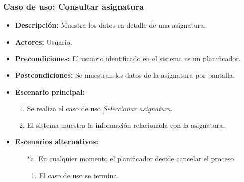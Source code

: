 \subsubsection*{Caso de uso: Consultar asignatura}
\begin{itemize}
\item{\bf Descripción:} Muestra los datos en detalle de una asignatura.
\item{\bf Actores:} Usuario.
\item{\bf Precondiciones:} El usuario identificado en el sistema es un planificador.
\item{\bf Postcondiciones:} Se muestran los datos de la asignatura por pantalla.
\item{\bf Escenario principal:} 
	\begin{enumerate}
	\item Se realiza el caso de uso {\em \hyperref[select_asignatura]{Seleccionar asignatura}}.
	\item El sistema muestra la información relacionada con la asignatura.
	\end{enumerate}
\item{\bf Escenarios alternativos:}
	\begin{itemize}
	\item[*a.] En cualquier momento el planificador decide cancelar el proceso.
		\begin{enumerate}
		\item El caso de uso se termina.
		\end{enumerate}
	\end{itemize}
\end{itemize}


